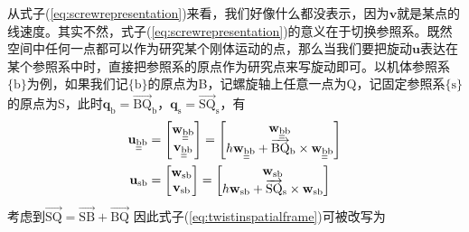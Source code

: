 \documentclass[12pt, a4paper, article, UTF8]{ctexart}
\begin{document}
从式子(\ref{eq:screwrepresentation})来看，我们好像什么都没表示，因为$\mathbf{v}$就是某点的线速度。其实不然，式子(\ref{eq:screwrepresentation})的意义在于切换参照系。既然空间中任何一点都可以作为研究某个刚体运动的点，那么当我们要把旋动$\mathbf{u}$表达在某个参照系中时，直接把参照系的原点作为研究点来写旋动即可。以机体参照系$\{\text{b}\}$为例，如果我们记$\{\text{b}\}$的原点为B，记螺旋轴上任意一点为Q，记固定参照系$\{\text{s}\}$的原点为S，此时$\mathbf{q}_\text{b} = \overrightarrow{\text{BQ}}_\text{b}$，$\mathbf{q}_\text{s} = \overrightarrow{\text{SQ}}_\text{s}$，有
\begin{align}
\mathbf{u}_\text{\underline{\underline{b}}b} &= 
\begin{bmatrix}
\mathbf{w}_\text{\underline{\underline{b}}b} \\ \mathbf{v}_\text{\underline{\underline{b}}b}
\end{bmatrix}
=\begin{bmatrix}
\mathbf{w}_\text{\underline{\underline{b}}b} \\ h\mathbf{w}_\text{\underline{\underline{b}}b} + \overrightarrow{\text{BQ}}_\text{b} \times \mathbf{w}_\text{\underline{\underline{b}}b}
\end{bmatrix} \\
\mathbf{u}_\text{sb} &= 
\begin{bmatrix}
\mathbf{w}_\text{sb} \\ \mathbf{v}_\text{sb}
\end{bmatrix} = \begin{bmatrix}
\mathbf{w}_\text{sb} \\ h\mathbf{w}_\text{sb} + \overrightarrow{\text{SQ}}_\text{s} \times \mathbf{w}_\text{sb}
\end{bmatrix} \label{eq:twistinspatialframe}
\end{align}
考虑到$\overrightarrow{\text{SQ}} = \overrightarrow{\text{SB}} + \overrightarrow{\text{BQ}}$
因此式子(\ref{eq:twistinspatialframe})可被改写为
\end{document}

